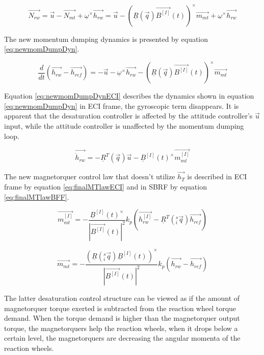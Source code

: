 \begin{equation}
\vec{N_{rw}} =  \vec{u} - \vec{N_{mt}} +  \underline{\omega}^\times\vec{h_{rw}} = 
\vec{u} - \left( \underline{R}(\vec{ q})  \vec{B^{[I]}}(t)\right)^\times \vec{m_{mt}}  +  \underline{\omega}^\times\vec{h_{rw}} 
\label{eq:newstateComp}
\end{equation}

The new momentum dumping dynamics is presented by equation \ref{eq:newmomDumpDyn}.

\begin{equation}
\label{eq:newmomDumpDyn}
\frac{d}{dt}(\vec{h_{rw}} - \vec{h_{ref}}) = -\vec{u} - \underline{\omega}^\times\vec{h_{rw}} - \left( \underline{R}(\vec{ q})  \vec{B^{[I]}}(t)\right)^\times \vec{m_{mt}}
\end{equation}

Equation \ref{eq:newmomDumpDynECI} describes the dynamics shown in equation \ref{eq:newmomDumpDyn} in ECI frame, the gyroscopic term disappears. It is apparent that the desaturation controller is affected by the attitude controller's $\vec{u}$ input, while the attitude controller is unaffected by the momentum dumping loop.

\begin{equation}
\label{eq:newmomDumpDynECI}
\vec{\dot{h}_{rw}} = -\underline{R}^T(\vec{ q})\vec{u} -  \underline{B}^{[I]}(t)^\times \vec{m_{mt}^{[I]}}
\end{equation}

The new magnetorquer control law that doesn't utilize $\vec{h_T}$ is described in ECI frame by equation \ref{eq:finalMTlawECI} and in SBRF by equation \ref{eq:finalMTlawBFF}.

\begin{equation}
\vec{m_{mt}^{[I]}} 
= - \frac{\underline{B}^{[I]}(t)^\times} {|\vec{B^{[I]}}(t) |^2} k_p\left(\vec{h_{rw}^{[I]}} - \underline{R}^T(^s_i\vec{ q})\vec{h_{ref}} \right)
\label{eq:finalMTlawECI}
\end{equation}

\begin{equation}
\vec{m_{mt}} 
= - \frac{\left( \underline{R}(^s_i\vec{ q}) \underline{B}^{[I]}(t)\right)^\times} {|\vec{B^{[I]}}(t) |^2} k_p\left(\vec{h_{rw}} - \vec{h_{ref}} \right)
\label{eq:finalMTlawBFF}
\end{equation}

The latter desaturation control structure can be viewed as if the amount of magnetorquer torque exerted is subtracted from the reaction wheel torque demand. When the torque demand is higher than the magnetorquer output torque, the magnetorquers help the reaction wheels, when it drops below a certain level, the magnetorquers are decreasing the angular momenta of the reaction wheels.


